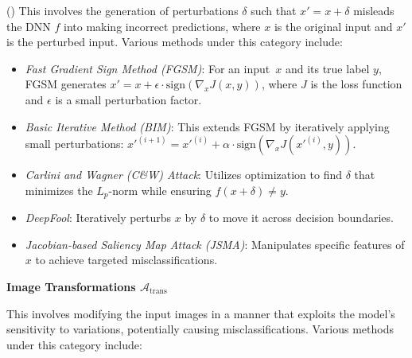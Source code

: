 (\adv) This involves the generation of perturbations $\delta$ such that $x' = x + \delta$ misleads the DNN $f$ into making incorrect predictions, where $x$ is the original input and $x'$ is the perturbed input. Various methods under this category include:

\begin{itemize}
    \item \emph{Fast Gradient Sign Method (FGSM)}: For an input~$x$ and its true label $y$, FGSM generates $x' = x + \epsilon \cdot \text{sign}(\nabla_x J(x, y))$, where $J$ is the loss function and $\epsilon$ is a small perturbation factor.
    \item \emph{Basic Iterative Method (BIM)}: This extends FGSM by iteratively applying small perturbations: $x'^{(i+1)} = x'^{(i)} + \alpha \cdot \text{sign}(\nabla_x J(x'^{(i)}, y))$.
    \item \emph{Carlini and Wagner (C\&W) Attack}: Utilizes optimization to find $\delta$ that minimizes the $L_p$-norm while ensuring $f(x + \delta) \neq y$.
    \item \emph{DeepFool}: Iteratively perturbs $x$ by $\delta$ to move it across decision boundaries.
    \item \emph{Jacobian-based Saliency Map Attack (JSMA)}: Manipulates specific features of $x$ to achieve targeted misclassifications.
\end{itemize}

\smallskip\noindent%
\textbf{Image Transformations $\mathcal{A}_{\text{trans}}$}

This involves modifying the input images in a manner that exploits the model's sensitivity to variations, potentially causing misclassifications. Various methods under this category include:

